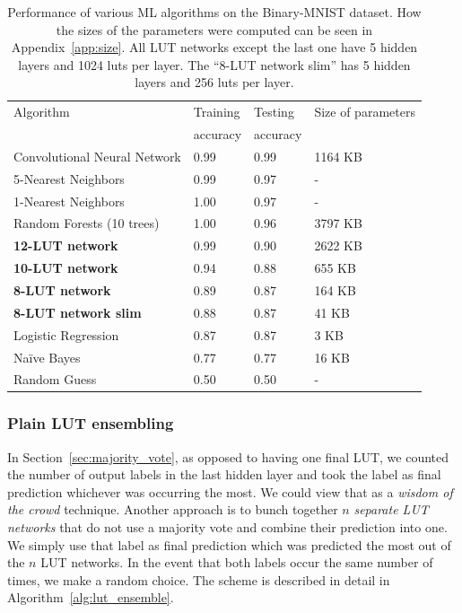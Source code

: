 \begin{table}[!htb]
    \begin{small}
        \begin{tabular}{llll}
        Algorithm & Training    & Testing    & Size of parameters \\
                  & accuracy    & accuracy   &                    \\ \hline
        Convolutional Neural Network & 0.99  & 0.99 & 1164 KB     \\
        5-Nearest Neighbors          & 0.99  & 0.97 & -           \\
        1-Nearest Neighbors          & 1.00  & 0.97 & -           \\
        Random Forests (10 trees)    & 1.00  & 0.96 & 3797 KB     \\
        \textbf{12-LUT network}      & 0.99  & 0.90 & 2622 KB     \\
        \textbf{10-LUT network}      & 0.94  & 0.88 & 655 KB      \\
        \textbf{8-LUT network}       & 0.89  & 0.87 & 164 KB      \\
        \textbf{8-LUT network slim}  & 0.88  & 0.87 & 41 KB       \\
        Logistic Regression          & 0.87  & 0.87 & 3 KB        \\
        Naïve Bayes                  & 0.77  & 0.77 & 16 KB       \\
        Random Guess                 & 0.50  & 0.50 & -  
        \end{tabular}
    \end{small}
    \caption{Performance of various ML algorithms on the Binary-MNIST dataset. How the sizes of the parameters were computed can be seen in Appendix~\ref{app:size}. All LUT networks except the last one have 5 hidden layers and 1024 luts per layer. The \enquote{8-LUT network slim} has 5 hidden layers and 256 luts per layer.}
\label{tab:ml_algos_on_bmnist}
\end{table}

\subsubsection{Plain LUT ensembling} \label{sec:plain_lut_ensemble}
In Section~\ref{sec:majority_vote}, as opposed to having one final LUT, we counted the number of output labels in the last hidden layer and took the label as final prediction whichever was occurring the most. We could view that as a \textit{wisdom of the crowd} technique. Another approach is to bunch together $n$ \textit{separate LUT networks} that do not use a majority vote and combine their prediction into one. We simply use that label as final prediction which was predicted the most out of the $n$ LUT networks. In the event that both labels occur the same number of times, we make a random choice. The scheme is described in detail in Algorithm~\ref{alg:lut_ensemble}.

